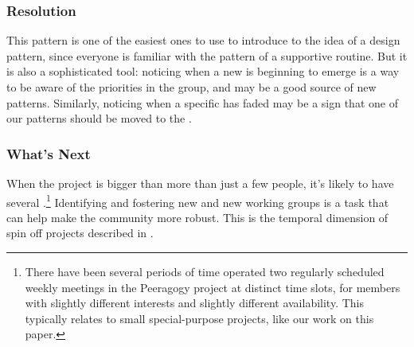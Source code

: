 \subsubsection*{Resolution} This pattern is one of the easiest ones to use to introduce  to the idea of a design pattern, since everyone is familiar with the pattern of a supportive routine.  But it is also a sophisticated tool: noticing when a new  is beginning to emerge is a way to be aware of the priorities in the group, and may be a good source of new patterns.  Similarly, noticing when a specific  has faded may be a sign that one of our patterns should be moved to the .

\subsubsection*{What's Next} When the project is bigger than more than just a few people, it's likely to have several .\footnote{There have been several periods of time operated two regularly scheduled weekly meetings in the Peeragogy project at distinct time slots, for members with slightly different interests and slightly different availability.  This typically relates to small special-purpose projects, like our work on this paper.}  Identifying and fostering new  and new working groups is a task that can help make the community more robust.  This is the temporal dimension of spin off projects described in .

